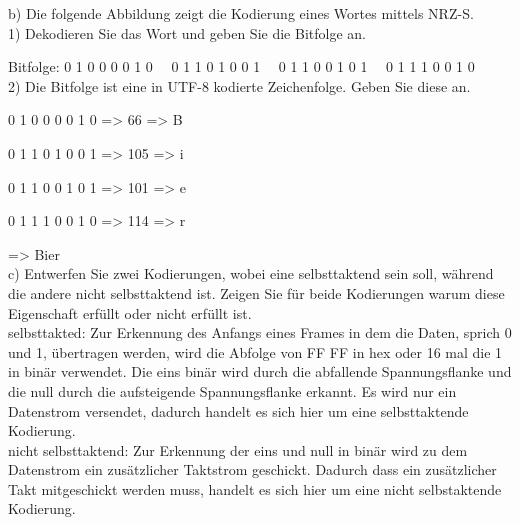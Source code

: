 \documentclass[12pt,a4paper,headsepline]{scrreprt}
\begin{document}
b) Die folgende Abbildung zeigt die Kodierung eines Wortes mittels NRZ-S.\\

1) Dekodieren Sie das Wort und geben Sie die Bitfolge an.

Bitfolge: 0 1 0 0 0 0 1 0 \ \  0 1 1 0 1 0 0 1 \ \  0 1 1 0 0 1 0 1 \ \  0 1 1 1 0 0 1 0\\

2) Die Bitfolge ist eine in UTF-8 kodierte Zeichenfolge. Geben Sie diese an.

0 1 0 0 0 0 1 0 => 66 => B

0 1 1 0 1 0 0 1 => 105 => i

0 1 1 0 0 1 0 1 => 101 => e

0 1 1 1 0 0 1 0 => 114 => r

=> Bier\\

c) Entwerfen Sie zwei Kodierungen, wobei eine selbsttaktend sein soll, während die andere nicht selbsttaktend ist. Zeigen Sie für beide Kodierungen warum diese Eigenschaft erfüllt oder nicht erfüllt ist.\\

selbsttakted: Zur Erkennung des Anfangs eines Frames in dem die Daten, sprich 0 und 1, übertragen werden, wird die Abfolge von FF FF in hex oder 16 mal die 1 in binär verwendet. Die eins binär wird durch die abfallende Spannungsflanke und die null durch die aufsteigende Spannungsflanke erkannt. Es wird nur ein Datenstrom versendet, dadurch handelt es sich hier um eine selbsttaktende Kodierung. \\

nicht selbsttaktend: Zur Erkennung der eins und null in binär wird zu dem Datenstrom ein zusätzlicher Taktstrom geschickt. Dadurch dass ein zusätzlicher Takt mitgeschickt werden muss, handelt es sich hier um eine nicht selbstaktende Kodierung.
\end{document}
